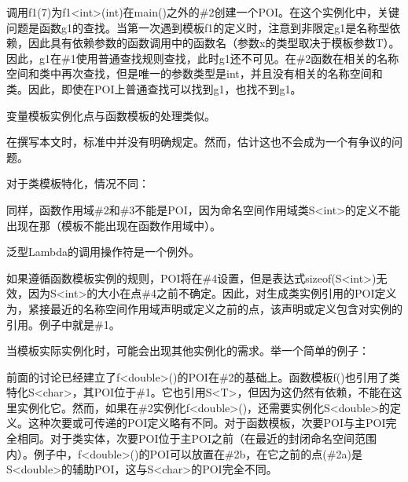 调用f1(7)为f1<int>(int)在main()之外的\#2创建一个POI。在这个实例化中，关键问题是函数g1的查找。当第一次遇到模板f1的定义时，注意到非限定g1是名称型依赖，因此具有依赖参数的函数调用中的函数名（参数x的类型取决于模板参数T）。因此，g1在\#1使用普通查找规则查找，此时g1还不可见。在\#2函数在相关的名称空间和类中再次查找，但是唯一的参数类型是int，并且没有相关的名称空间和类。因此，即使在POI上普通查找可以找到g1，也找不到g1。

变量模板实例化点与函数模板的处理类似。

\begin{notice}
在撰写本文时，标准中并没有明确规定。然而，估计这也不会成为一个有争议的问题。
\end{notice}

对于类模板特化，情况不同：


同样，函数作用域\#2和\#3不能是POI，因为命名空间作用域类S<int>的定义不能出现在那（模板不能出现在函数作用域中）。

\begin{notice}
泛型Lambda的调用操作符是一个例外。
\end{notice}

如果遵循函数模板实例的规则，POI将在\#4设置，但是表达式sizeof(S<int>)无效，因为S<int>的大小在点\#4之前不确定。因此，对生成类实例引用的POI定义为，紧接最近的名称空间作用域声明或定义之前的点，该声明或定义包含对实例的引用。例子中就是\#1。

当模板实际实例化时，可能会出现其他实例化的需求。举一个简单的例子：


前面的讨论已经建立了f<double>()的POI在\#2的基础上。函数模板f()也引用了类特化S<char>，其POI位于\#1。它也引用S<T>，但因为这仍然有依赖，不能在这里实例化它。然而，如果在\#2实例化f<double>()，还需要实例化S<double>的定义。这种次要或可传递的POI定义略有不同。对于函数模板，次要POI与主POI完全相同。对于类实体，次要POI位于主POI之前（在最近的封闭命名空间范围内）。例子中，f<double>()的POI可以放置在\#2b，在它之前的点(\#2a)是S<double>的辅助POI，这与S<char>的POI完全不同。

